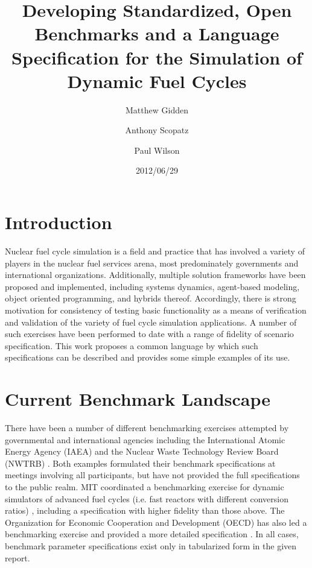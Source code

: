 \documentclass{anstrans}
\title{Developing Standardized, Open Benchmarks and a Language Specification 
for the Simulation of Dynamic Fuel Cycles}
\author[*]{Matthew Gidden}
\author[$\dag$]{Anthony Scopatz}
\author[*]{Paul Wilson}
\affil[*]{Department of Nuclear Engineering \& Engineering Physics, 
University of Wisconsin - Madison, Madison, WI, 53703}
\affil[$\dag$]{The Flash Center for Computational Science, University 
of Chicago, Chicago, IL, 60637}
\date{2012/06/29}
\begin{document}
\section{Introduction}
Nuclear fuel cycle simulation is a field and practice that has involved a
variety of players in the nuclear fuel services arena, most predominately
governments and international organizations.  Additionally, multiple solution
frameworks have been proposed and implemented, including systems dynamics,
agent-based modeling, object oriented programming, and hybrids
thereof. Accordingly, there is strong motivation for consistency of testing
basic functionality as a means of verification and validation of the variety of
fuel cycle simulation applications. A number of such exercises have been
performed to date with a range of fidelity of scenario specification. This work
proposes a common language by which such specifications can be described and
provides some simple examples of its use.

\section{Current Benchmark Landscape}
There have been a number of different benchmarking exercises attempted by
governmental and international agencies including the International Atomic
Energy Agency (IAEA) \cite{_international_2011} and the Nuclear Waste Technology
Review Board (NWTRB) \cite{_nuclear_2011}.  Both examples formulated their
benchmark specifications at meetings involving all participants, but have not
provided the full specifications to the public realm. MIT coordinated a
benchmarking exercise for dynamic simulators of advanced fuel cycles (i.e. fast
reactors with different conversion ratios) \cite{guerin_benchmark_2009},
including a specification with higher fidelity than those above. The
Organization for Economic Cooperation and Development (OECD) has also led a
benchmarking exercise \cite{boucher_benchmark_2012} and provided a more detailed
specification \cite{boucher_specification_2008}. In all cases, benchmark
parameter specifications exist only in tabularized form in the given report.

\end{document}
